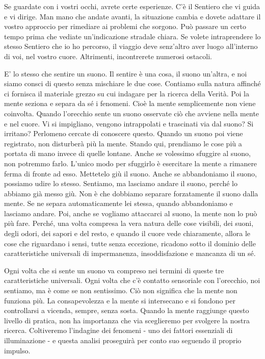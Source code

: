 Se guardate con i vostri occhi, avrete certe esperienze. C'è il Sentiero
che vi guida e vi dirige. Man mano che andate avanti, la situazione
cambia e dovete adattare il vostro approccio per rimediare ai problemi
che sorgono. Può passare un certo tempo prima che vediate un'indicazione
stradale chiara. Se volete intraprendere lo stesso Sentiero che io ho
percorso, il viaggio deve senz'altro aver luogo all'interno di voi, nel
vostro cuore. Altrimenti, incontrerete numerosi ostacoli.

E' lo stesso che sentire un suono. Il sentire è una cosa, il suono
un'altra, e noi siamo consci di questo senza mischiare le due cose.
Contiamo sulla natura affinché ci fornisca il materiale grezzo su cui
indagare per la ricerca della Verità. Poi la mente seziona e separa da
sé i fenomeni. Cioè la mente semplicemente non viene coinvolta. Quando
l'orecchio sente un suono osservate ciò che avviene nella mente e nel
cuore. Vi si impigliano, vengono intrappolati e trascinati via dal
suono? Si irritano? Perlomeno cercate di conoscere questo. Quando un
suono poi viene registrato, non disturberà più la mente. Stando qui,
prendiamo le cose più a portata di mano invece di quelle lontane. Anche
se volessimo sfuggire al suono, non potremmo farlo. L'unico modo per
sfuggirlo è esercitare la mente a rimanere ferma di fronte ad esso.
Mettetelo giù il suono. Anche se abbandoniamo il suono, possiamo udire
lo stesso. Sentiamo, ma lasciamo andare il suono, perché lo abbiamo già
messo giù. Non è che dobbiamo separare forzatamente il suono dalla
mente. Se ne separa automaticamente lei stessa, quando abbandoniamo e
lasciamo andare. Poi, anche se vogliamo attaccarci al suono, la mente
non lo può più fare. Perché, una volta compresa la vera natura delle
cose visibili, dei suoni, degli odori, dei sapori e del resto, e quando
il cuore vede chiaramente, allora le cose che riguardano i sensi, tutte
senza eccezione, ricadono sotto il dominio delle caratteristiche
universali di impermanenza, insoddisfazione e mancanza di un sé.

Ogni volta che si sente un suono va compreso nei termini di queste tre
caratteristiche universali. Ogni volta che c'è contatto sensoriale con
l'orecchio, noi sentiamo, ma è come se non sentissimo. Ciò non significa
che la mente non funziona più. La consapevolezza e la mente si
intersecano e si fondono per controllarsi a vicenda, sempre, senza
sosta. Quando la mente raggiunge questo livello di pratica, non ha
importanza che via sceglieremo per svolgere la nostra ricerca.
Coltiveremo l'indagine dei fenomeni - uno dei fattori essenziali di
illuminazione - e questa analisi proseguirà per conto suo seguendo il
proprio impulso.

